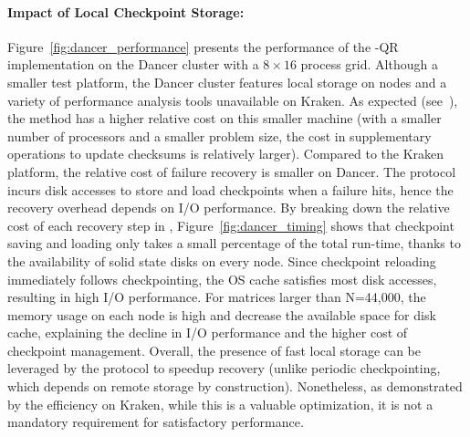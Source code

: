 \paragraph*{Impact of Local Checkpoint Storage:}

Figure~\ref{fig:dancer_performance} presents the performance of the \cof-QR 
implementation on the Dancer cluster with a $8\times 16$ process
grid. Although a smaller test platform, the Dancer cluster features
local storage on nodes and a variety of performance analysis tools
unavailable on Kraken. As expected (see~\cite{pengduppopp12}), the \abft
method has a higher relative cost on this smaller machine (with a 
smaller number of processors and a smaller problem size, the cost in 
supplementary operations to update checksums is relatively larger). 
Compared to
the Kraken platform, the relative cost of \cof failure recovery is
smaller on Dancer. The \cof protocol incurs disk accesses to store and
load checkpoints when a failure hits, hence the recovery overhead
depends on I/O performance. By breaking down the relative cost of each
recovery step in \cof, Figure~\ref{fig:dancer_timing} shows that
checkpoint saving and loading only takes a small percentage of the total
run-time, thanks to the availability of solid state disks on every node.
Since checkpoint reloading immediately follows checkpointing, the OS
cache satisfies most disk accesses, resulting in high I/O performance. For
matrices larger than N=44,000, the memory usage on each node is high and
decrease the available space for disk cache, explaining the decline in
I/O performance and the higher cost of checkpoint management. Overall,
the presence of fast local storage can be leveraged by the \cof protocol
to speedup recovery (unlike periodic checkpointing, which
depends on remote storage by construction). Nonetheless, as demonstrated by the
efficiency on Kraken, while this is a valuable optimization, it is not a
mandatory requirement for satisfactory performance.



